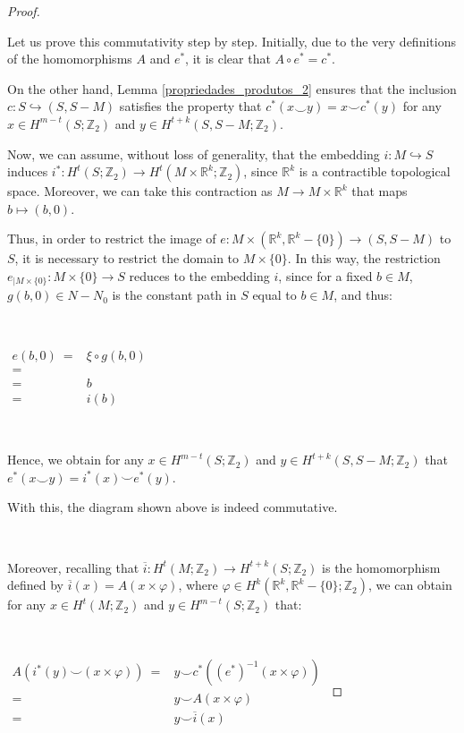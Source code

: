 \documentclass[12pt,oneside]{book}
\newcommand{\R}{\mathbb{R}}
\newcommand{\Z}{\mathbb{Z}}
\newcommand{\ccup}{\smile}
\begin{document}
\begin{proof}
        \

        Let us prove this commutativity step by step. Initially, due to the very definitions of the homomorphisms $A$ and $e^{*}$, it is clear 
        that $A\circ e^{*}=c^{*}$.

        On the other hand, Lemma \ref{propriedades_produtos_2} ensures that the inclusion $c:S\hookrightarrow (S,S-M)$ satisfies the property 
        that $c^{*}(x\ccup y)=x\ccup c^{*}(y)$ for any $x\in H^{m-t}(S;\Z_{2})$ and $y\in H^{t+k}(S,S-M;\Z_{2})$.

        Now, we can assume, without loss of generality, that the embedding $i:M\hookrightarrow S$ induces 
        $i^{*}:H^{t}(S;\Z_{2})\to H^{t}(M\times\R^{k};\Z_{2})$, since $\R^{k}$ is a contractible topological space. Moreover, we can take this 
        contraction as $M\to M\times \R^{k}$ that maps $b\mapsto (b,0)$.

        Thus, in order to restrict the image of $e:M\times(\R^{k},\R^{k}-\{0\})\to (S,S-M)$ to $S$, it is necessary to restrict the domain to 
        $M\times \{0\}$. In this way, the restriction $e_{|M\times\{0\}}:M\times\{0\}\to S$ reduces to the embedding $i$, since for a fixed 
        $b\in M$, $g(b,0)\in N-N_{0}$ is the constant path in $S$ equal to $b\in M$, and thus:

        \

        $ \begin{array}{rl}
        	e(b,0) \ = & \xi\circ g(b,0) \\
        	= &   \\
        	= & b \\
        	= & i(b)
        \end{array} $

        \

        Hence, we obtain for any $x\in H^{m-t}(S;\Z_{2})$ and $y\in H^{t+k}(S,S-M;\Z_{2})$ that $e^{*}(x\ccup y)=i^{*}(x)\ccup e^{*}(y)$.

        With this, the diagram shown above is indeed commutative.

        \
        
        Moreover, recalling that $\overline{i}:H^{t}(M;\Z_{2})\to H^{t+k}(S;\Z_{2})$ is the homomorphism defined by 
        $\overline{i}(x)=A(x\times \varphi)$, where $\varphi\in H^{k}(\R^{k},\R^{k}-\{0\};\Z_{2})$, we can obtain for any 
        $x\in H^{t}(M;\Z_{2})$ and $y\in H^{m-t}(S;\Z_{2})$ that:

        \

        $ \begin{array}{rl}
        	A(i^{*}(y)\ccup (x\times\varphi)) \ = & y\ccup c^{*}((e^{*})^{-1}(x\times\varphi)) \\
        	= & y\ccup A(x\times\varphi) \\
        	= & y\ccup \overline{i}(x)
        \end{array} $


\end{proof}
\end{document}
